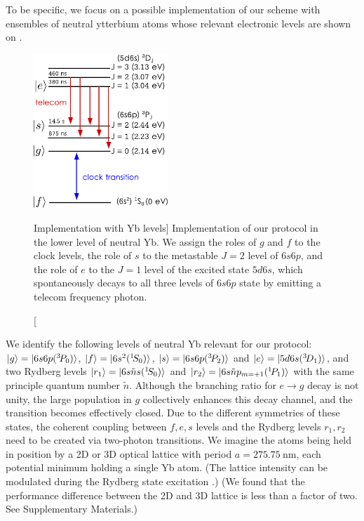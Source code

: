 To be specific, we focus on a possible implementation of our scheme with
ensembles of neutral ytterbium atoms whose relevant electronic levels are shown on
.
\begin{figure}[h]
\centering
\includegraphics[width=0.45\textwidth]{./figs_Komar2015/Yb_levels.pdf}
\caption
[Implementation with Yb levels]
{ 
\label{fig:Yb_levels}
Implementation of our protocol in the lower level of neutral Yb. We assign
the roles of $g$ and $f$ to the clock levels, the role of $s$ to the metastable
$J=2$ level of $6s6p$, and the role of $e$ to the $J=1$ level of the excited
state $5d6s$, which spontaneously decays to all three levels of $6s6p$ state by
emitting a telecom frequency photon.}
\end{figure}
We identify the  following levels of neutral
Yb  relevant for our protocol:
$| g \rangle =
| 6s6p({}^3\!P_0) \rangle$, $| f \rangle = | 6s^2({}^1\!S_0) \rangle$, $| s \rangle =
| 6s6p({}^3\!P_2) \rangle$ and $| e \rangle = | 5d6s({}^3\!D_1) \rangle$, and two Rydberg
levels $| r_1 \rangle = | 6s\tilde n s({}^1\!S_0) \rangle$ and $| r_2 \rangle =
| 6s\tilde n p_{m=+1}({}^1\!P_1) \rangle$ with the same principle
quantum number $\tilde n$. 
Although the branching ratio for $e\rightarrow g$ decay is not unity, the
large population in $g$ collectively enhances this decay channel, and the
transition becomes effectively closed. Due to the different symmetries of these
states, the coherent coupling between $f,e, s$ levels and the Rydberg levels
$r_1, r_2$ need to be created via two-photon transitions. We imagine the atoms
being held in position by a 2D or 3D optical lattice with period $a =
275.75~\mathrm{nm}$, each potential minimum holding a single Yb atom. (The lattice
intensity can be modulated during the Rydberg state excitation
\cite{Tiecke2014}.)  (We found that the performance difference between the 2D
and 3D lattice is less than a factor of two. See Supplementary Materials.)
 
